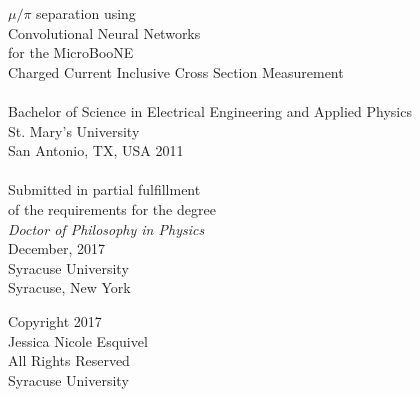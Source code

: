 \documentclass[hyperpdf,bindnopdf,usenames,dvipsnames,svgnames,table]{hepthesis}
\begin{document}
\begin{frontmatter}
\begin{center}
\vspace*{0.2cm}
\noindent\makebox[\linewidth]{\rule{\textwidth}{0.3pt}}
{\huge %
$\mu/\pi$ separation using\\ Convolutional Neural Networks \\for the MicroBooNE\\Charged Current Inclusive Cross Section Measurement 
}
\noindent\makebox[\linewidth]{\rule{\textwidth}{0.3pt}}\\ %
\vspace{0.5cm}
\vspace{0.5cm}
\\[6pt]
Bachelor of Science in Electrical Engineering and Applied Physics\\
St. Mary's University\\
San Antonio, TX, USA 2011\\
\vspace{1.3cm}
\\[6pt]
Submitted in partial fulfillment\\
of the requirements for the degree\\
\emph{Doctor of Philosophy in Physics}\\
December, 2017\\
Syracuse University\\
Syracuse, New York

\end{center}
\thispagestyle{empty}
\clearpage

\vspace*{5cm}
\begin{center}
    Copyright 2017\\
    Jessica Nicole Esquivel\\
    All Rights Reserved\\
    Syracuse University\\
\end{center}
\thispagestyle{empty}

 
  
\end{frontmatter}
\end{document}
